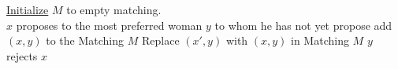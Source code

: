     \begin{algorithm}[H]
    
        \underline{Initialize} $M$ to empty matching.\\
          {
            $x$ proposes to the most preferred woman $y$ to whom he has not yet propose\;
            {
                add $(x, y)$ to the Matching $M$\; 
            }
            {
                Replace $(x', y)$ with $(x, y)$ in Matching $M$\;
            }
            \Else
            {
                $y$ rejects $x$\;
            }
          }
        \caption{Gale–Shapley Deferred Acceptance Algorithm (men-proposing version) \footnote{See footnote 5 below}}
    \end{algorithm}
 

